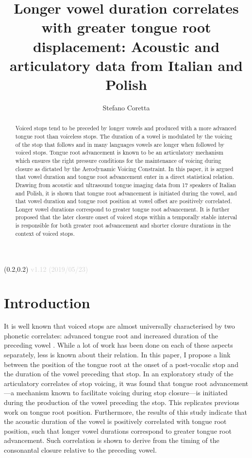\documentclass[
  12pt,
]{article}
\title{Longer vowel duration correlates with greater tongue root displacement:
Acoustic and articulatory data from Italian and Polish}
\author{Stefano Coretta}
\date{}
\begin{document}
\begin{textblock}{3}(0.2,0.2)
  \textcolor{lightgray}{v1.12 (2019/05/23)}
\end{textblock}
\maketitle

\begin{abstract}
Voiced stops tend to be preceded by longer vowels and produced with a more advanced tongue root than voiceless stops.
The duration of a vowel is modulated by the voicing of the stop that follows and in many languages vowels are longer when followed by voiced stops.
Tongue root advancement is known to be an articulatory mechanism which ensures the right pressure conditions for the maintenance of voicing during closure as dictated by the Aerodynamic Voicing Constraint.
In this paper, it is argued that vowel duration and tongue root advancement enter in a direct statistical relation.
Drawing from acoustic and ultrasound tongue imaging data from 17 speakers of Italian and Polish, it is shown that tongue root advancement is initiated during the vowel, and that vowel duration and tongue root position at vowel offset are positively correlated.
Longer vowel durations correspond to greater tongue root advancement.
It is further proposed that the later closure onset of voiced stops within a temporally stable interval is responsible for both greater root advancement and shorter closure durations in the context of voiced stops.
\end{abstract}

\hypertarget{introduction}{%
\section{Introduction}\label{introduction}}

It is well known that voiced stops are almost universally characterised
by two phonetic correlates: advanced tongue root and increased duration
of the preceding vowel \citep{westbury1983, lisker1974, fowler1992}.
While a lot of work has been done on each of these aspects separately,
less is known about their relation. In this paper, I propose a link
between the position of the tongue root at the onset of a post-vocalic
stop and the duration of the vowel preceding that stop. In an
exploratory study of the articulatory correlates of stop voicing, it was
found that tongue root advancement---a mechanism known to facilitate
voicing during stop closure---is initiated during the production of the
vowel preceding the stop. This replicates previous work on tongue root
position. Furthermore, the results of this study indicate that the
acoustic duration of the vowel is positively correlated with tongue root
position, such that longer vowel durations correspond to greater tongue
root advancement. Such correlation is shown to derive from the timing of
the consonantal closure relative to the preceding vowel.
\end{document}
